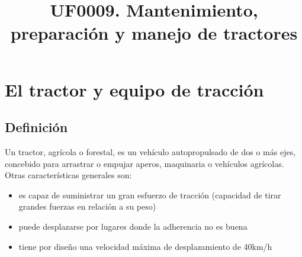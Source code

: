 \documentclass[a4paper,12pt,oneside]{article}
\date{}
\title{UF0009. Mantenimiento, preparación y manejo de tractores}
\begin{document}
\maketitle
\thispagestyle{empty} \tableofcontents \clearpage\section{El tractor y equipo de tracción}
\label{sec:org3a98156}
\subsection{Definición}
\label{sec:org34397c3}
Un tractor, agrícola o forestal, es un vehículo autopropulsado de dos o más
ejes, concebido para arrastrar o empujar aperos, maquinaria o vehículos
agrícolas. 
Otras características generales son:
\begin{itemize}
\item es capaz de suministrar un gran esfuerzo de tracción (capacidad de tirar
grandes fuerzas en relación a su peso)
\item puede desplazarse por lugares donde la adherencia no es buena
\item tiene por diseño una velocidad máxima de desplazamiento de 40km/h
\end{itemize}
\end{document}
